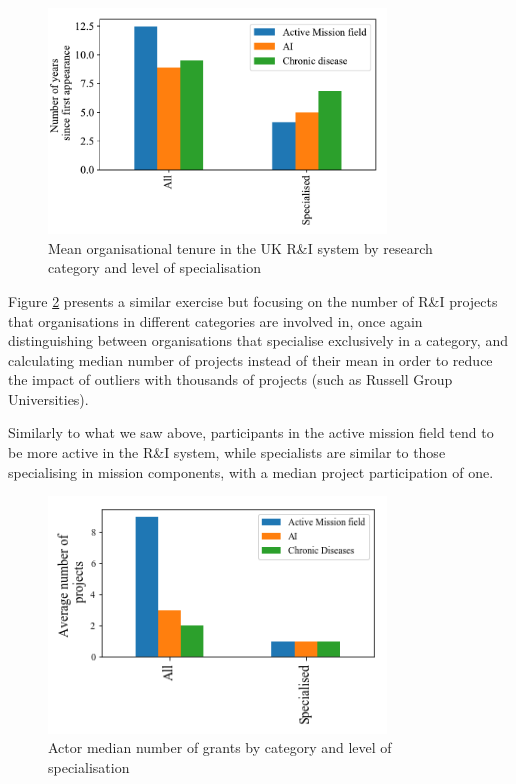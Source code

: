 \documentclass[11pt]{article}
\begin{document}
\begin{figure}[!ht]
    \centering
    \includegraphics[width=0.8\textwidth]{figures/fig_13_actor_experience.pdf}
    \caption{Mean organisational tenure in the UK R\&I system by research category and level of specialisation}
    \label{fig:actor_exp}
\end{figure}

Figure \ref{fig:actor_projs} presents a similar exercise but focusing on the number of R\&I projects that organisations in different categories are involved in, once again distinguishing between organisations that specialise exclusively in a category, and calculating median number of projects instead of their mean in order to reduce the impact of outliers with thousands of projects (such as Russell Group Universities). 

Similarly to what we saw above, participants in the active mission field tend to be more active in the R&I system, while specialists are similar to those specialising in mission components, with a median project participation of one.

\begin{figure}[!ht]
    \centering
    \includegraphics[width=0.8\textwidth]{figures/fig_14_actor_projects.png}
    \caption{Actor median number of grants by category and level of specialisation}
    \label{fig:actor_projs}
\end{figure}
\end{document}
